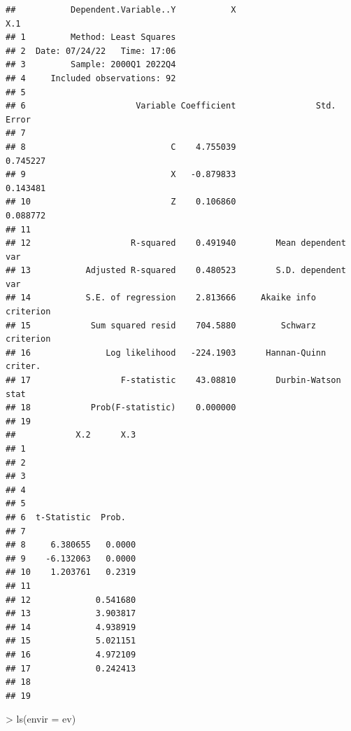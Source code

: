 \documentclass[
]{article}
\newenvironment{Shaded}{\begin{snugshade}}{\end{snugshade}}
\newcommand{\AttributeTok}[1]{\textcolor[rgb]{0.77,0.63,0.00}{#1}}
\newcommand{\FunctionTok}[1]{\textcolor[rgb]{0.00,0.00,0.00}{#1}}
\newcommand{\NormalTok}[1]{#1}
\newcommand{\SpecialCharTok}[1]{\textcolor[rgb]{0.00,0.00,0.00}{#1}}
\begin{document}
\begin{Shaded}
\end{Shaded}

\begin{verbatim}
##           Dependent.Variable..Y           X                       X.1
## 1         Method: Least Squares                                      
## 2  Date: 07/24/22   Time: 17:06                                      
## 3         Sample: 2000Q1 2022Q4                                      
## 4     Included observations: 92                                      
## 5                                                                    
## 6                      Variable Coefficient                Std. Error
## 7                                                                    
## 8                             C    4.755039                  0.745227
## 9                             X   -0.879833                  0.143481
## 10                            Z    0.106860                  0.088772
## 11                                                                   
## 12                    R-squared    0.491940        Mean dependent var
## 13           Adjusted R-squared    0.480523        S.D. dependent var
## 14           S.E. of regression    2.813666     Akaike info criterion
## 15            Sum squared resid    704.5880         Schwarz criterion
## 16               Log likelihood   -224.1903      Hannan-Quinn criter.
## 17                  F-statistic    43.08810        Durbin-Watson stat
## 18            Prob(F-statistic)    0.000000                          
## 19                                                                   
##            X.2      X.3
## 1                      
## 2                      
## 3                      
## 4                      
## 5                      
## 6  t-Statistic  Prob.  
## 7                      
## 8     6.380655   0.0000
## 9    -6.132063   0.0000
## 10    1.203761   0.2319
## 11                     
## 12             0.541680
## 13             3.903817
## 14             4.938919
## 15             5.021151
## 16             4.972109
## 17             0.242413
## 18                     
## 19
\end{verbatim}

\begin{Shaded}
\begin{Highlighting}[]
\SpecialCharTok{\textgreater{}} \FunctionTok{ls}\NormalTok{(}\AttributeTok{envir =}\NormalTok{ ev)}
\end{Highlighting}
\end{Shaded}
\end{document}
